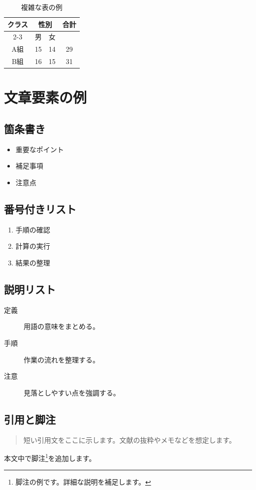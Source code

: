 \documentclass{ltjsarticle}
\theoremstyle{definition}
\begin{document}
\begin{table}[htbp]
  \centering
  \caption{複雑な表の例}
  \begin{tabular}{|c|c|c|c|} \hline
    \multirow{2}{*}{クラス} & \multicolumn{2}{c|}{性別} & \multirow{2}{*}{合計} \\ \cline{2-3}
     & 男 & 女 & \\ \hline
    A組 & 15 & 14 & 29 \\ \hline
    B組 & 16 & 15 & 31 \\ \hline
  \end{tabular}
\end{table}

\section{文章要素の例}

\subsection{箇条書き}
\begin{itemize}
  \item 重要なポイント
  \item 補足事項
  \item 注意点
\end{itemize}

\subsection{番号付きリスト}
\begin{enumerate}
  \item 手順の確認
  \item 計算の実行
  \item 結果の整理
\end{enumerate}

\subsection{説明リスト}
\begin{description}
  \item[定義] 用語の意味をまとめる。
  \item[手順] 作業の流れを整理する。
  \item[注意] 見落としやすい点を強調する。
\end{description}

\subsection{引用と脚注}
\begin{quote}
  短い引用文をここに示します。文献の抜粋やメモなどを想定します。
\end{quote}
本文中で脚注\footnote{脚注の例です。詳細な説明を補足します。}を追加します。
\end{document}
